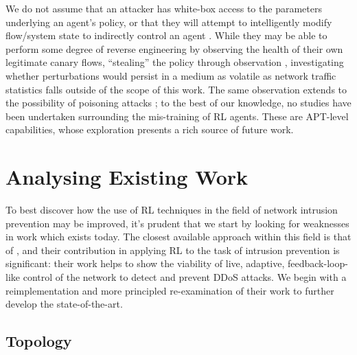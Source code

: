 \documentclass[conference, letterpaper, 10pt, times]{IEEEtran}
\begin{document}
We do not assume that an attacker has white-box access to the parameters underlying an agent's policy, or that they will attempt to intelligently modify flow/system state to indirectly control an agent \cite{DBLP:conf/eurosp/PapernotMJFCS16, DBLP:conf/eurosp/PapernotMSW18, DBLP:journals/corr/HuangPGDA17, DBLP:conf/sp/Carlini017}.
While they may be able to perform some degree of reverse engineering by observing the health of their own legitimate canary flows, ``stealing'' the policy through observation \cite{DBLP:conf/uss/TramerZJRR16}, investigating whether perturbations would persist in a medium as volatile as network traffic statistics falls outside of the scope of this work.
The same observation extends to the possibility of poisoning attacks \cite{DBLP:journals/jmlr/KloftL10, DBLP:conf/acsac/ShenTS16}; to the best of our knowledge, no studies have been undertaken surrounding the mis-training of RL agents.
These are APT-level capabilities, whose exploration presents a rich source of future work.

\section{Analysing Existing Work}\label{sec:environment-and-rl-algorithm}
To best discover how the use of RL techniques in the field of network intrusion prevention may be improved, it's prudent that we start by looking for weaknesses in work which exists today.
The closest available approach within this field is that of \textcite{DBLP:journals/eaai/MalialisK15}, and their contribution in applying RL to the task of intrusion prevention is significant: their work helps to show the viability of live, adaptive, feedback-loop-like control of the network to detect and prevent DDoS attacks.
We begin with a reimplementation and more principled re-examination of their work to further develop the state-of-the-art.



\subsection{Topology}\label{sec:topology}
\end{document}
